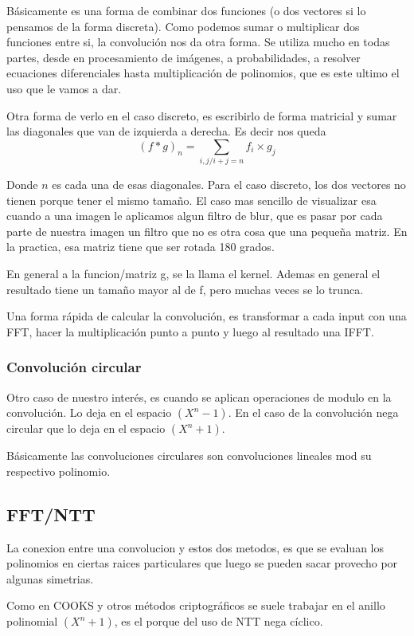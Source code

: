 \documentclass[12pt, oneside]{article}
\begin{document}
Básicamente es una forma de combinar dos funciones (o dos vectores si lo pensamos de la forma discreta).
Como podemos sumar o multiplicar dos funciones entre si, la convolución nos da otra forma.
Se utiliza mucho en todas partes, desde en procesamiento de imágenes, a probabilidades, a resolver ecuaciones diferenciales hasta
multiplicación   de polinomios, que es este ultimo el uso que le vamos a dar.

Otra forma de verlo en el caso discreto, es escribirlo de forma matricial y sumar las diagonales que van de izquierda a derecha.
Es decir nos queda
\begin{equation*}
    (f*g)_n = \sum_{i,j / i+j=n} f_i\times g_j
\end{equation*}

Donde $n$ es cada una de esas diagonales.
Para el caso discreto, los dos vectores no tienen porque tener el mismo tamaño.
El caso mas sencillo de visualizar esa cuando a una imagen le aplicamos algun filtro de blur, que es pasar por cada parte
de nuestra imagen un filtro que no es otra cosa que una pequeña matriz.
En la practica, esa matriz tiene que ser rotada 180 grados.

En general a la funcion/matriz g, se la llama el kernel.
Ademas en general el resultado tiene un tamaño mayor al de f, pero muchas veces se lo trunca.

Una forma rápida de calcular la convolución, es transformar a cada input con una FFT, hacer
la multiplicación punto a punto y luego al resultado una IFFT.

\subsubsection{Convolución circular}
Otro caso de nuestro interés, es cuando se aplican operaciones de modulo en la convolución.
Lo deja en el espacio $(X^n-1)$.
En el caso de la convolución nega circular que lo deja en el espacio $(X^n+1)$.

Básicamente las convoluciones circulares son convoluciones lineales mod su respectivo polinomio.

\subsection{FFT/NTT}
La conexion entre una convolucion y estos dos metodos, es que se evaluan los polinomios en ciertas
raices particulares que luego se pueden sacar provecho por algunas simetrias.

Como en COOKS y otros métodos criptográficos se suele trabajar en el anillo polinomial $(X^n+1)$, es el porque del uso de
NTT nega cíclico.
\end{document}
